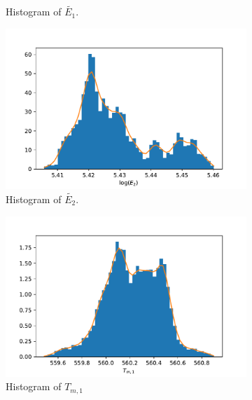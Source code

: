 \begin{figure}[h!]
\begin{subfigure}{0.5\textwidth}
\caption{Histogram of $\tilde{E_1}$.}
\label{HistE1}
\end{subfigure}%
\begin{subfigure}{0.5\textwidth}
\centering
\includegraphics[width=\linewidth]{figures/bayesian/2_reactions/mass/hist_E2.pdf}
\caption{Histogram of $\tilde{E_2}$.}
\label{HistE2}
\end{subfigure}
\newline
\begin{subfigure}{0.5\textwidth}
\centering
\includegraphics[width=\linewidth]{figures/bayesian/2_reactions/mass/hist_Tm1.pdf}
\caption{Histogram of $T_{m,1}$}
\label{HistTm1}
\end{subfigure}%
\begin{subfigure}{0.5\textwidth}
\centering

\end{subfigure}
\end{figure}
